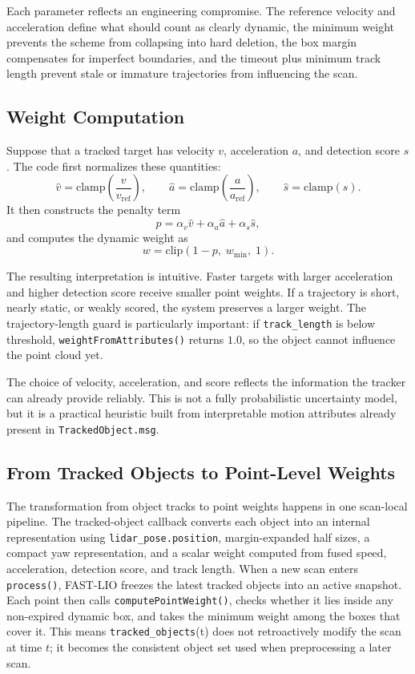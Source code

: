\documentclass[a4paper,12pt]{article}
\newcommand{\code}[1]{\nolinkurl{#1}}
\begin{document}
Each parameter reflects an engineering compromise. The reference velocity and acceleration define what should count as clearly dynamic, the minimum weight prevents the scheme from collapsing into hard deletion, the box margin compensates for imperfect boundaries, and the timeout plus minimum track length prevent stale or immature trajectories from influencing the scan.

\subsection{Weight Computation}
Suppose that a tracked target has velocity \(v\), acceleration \(a\), and detection score \(s\). The code first normalizes these quantities:
\begin{equation}
\hat{v}=\mathrm{clamp}\!\left(\frac{v}{v_{\mathrm{ref}}}\right), \qquad
\hat{a}=\mathrm{clamp}\!\left(\frac{a}{a_{\mathrm{ref}}}\right), \qquad
\hat{s}=\mathrm{clamp}(s).
\end{equation}
It then constructs the penalty term
\begin{equation}
p = \alpha_v \hat{v} + \alpha_a \hat{a} + \alpha_s \hat{s},
\end{equation}
and computes the dynamic weight as
\begin{equation}
w = \mathrm{clip}(1-p,\; w_{\min},\; 1).
\end{equation}

The resulting interpretation is intuitive. Faster targets with larger acceleration and higher detection score receive smaller point weights. If a trajectory is short, nearly static, or weakly scored, the system preserves a larger weight. The trajectory-length guard is particularly important: if \texttt{track\_length} is below threshold, \texttt{weightFromAttributes()} returns \(1.0\), so the object cannot influence the point cloud yet.

The choice of velocity, acceleration, and score reflects the information the tracker can already provide reliably. This is not a fully probabilistic uncertainty model, but it is a practical heuristic built from interpretable motion attributes already present in \texttt{TrackedObject.msg}.

\subsection{From Tracked Objects to Point-Level Weights}
The transformation from object tracks to point weights happens in one scan-local pipeline. The tracked-object callback converts each object into an internal representation using \code{lidar_pose.position}, margin-expanded half sizes, a compact yaw representation, and a scalar weight computed from fused speed, acceleration, detection score, and track length. When a new scan enters \code{process()}, FAST-LIO freezes the latest tracked objects into an active snapshot. Each point then calls \code{computePointWeight()}, checks whether it lies inside any non-expired dynamic box, and takes the minimum weight among the boxes that cover it. This means \code{tracked_objects}(t) does not retroactively modify the scan at time \(t\); it becomes the consistent object set used when preprocessing a later scan.
\end{document}
